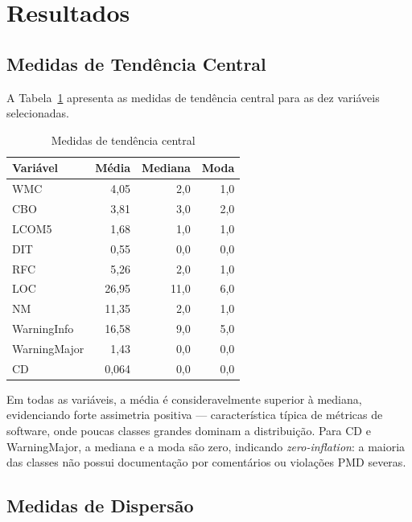 \documentclass[12pt]{article}
\begin{document}
\section{Resultados}
\label{sec:resultados}

\subsection{Medidas de Tendência Central}
\label{sec:central}

A Tabela~\ref{tab:central} apresenta as medidas de tendência central
para as dez variáveis selecionadas.

\begin{table}[H]
\centering
\caption{Medidas de tendência central}
\label{tab:central}
\begin{tabular}{lrrr}
\toprule
\textbf{Variável} & \textbf{Média} & \textbf{Mediana} & \textbf{Moda} \\
\midrule
WMC          & 4,05  & 2,0  & 1,0 \\
CBO          & 3,81  & 3,0  & 2,0 \\
LCOM5        & 1,68  & 1,0  & 1,0 \\
DIT          & 0,55  & 0,0  & 0,0 \\
RFC          & 5,26  & 2,0  & 1,0 \\
LOC          & 26,95 & 11,0 & 6,0 \\
NM           & 11,35 & 2,0  & 1,0 \\
WarningInfo  & 16,58 & 9,0  & 5,0 \\
WarningMajor & 1,43  & 0,0  & 0,0 \\
CD           & 0,064 & 0,0  & 0,0 \\
\bottomrule
\end{tabular}
\end{table}

Em todas as variáveis, a média é consideravelmente superior à mediana,
evidenciando forte assimetria positiva — característica típica de
métricas de software, onde poucas classes grandes dominam a distribuição.
Para CD e WarningMajor, a mediana e a moda são zero, indicando
\textit{zero-inflation}: a maioria das classes não possui documentação
por comentários ou violações PMD severas.

\subsection{Medidas de Dispersão}
\label{sec:dispersao}
\end{document}
